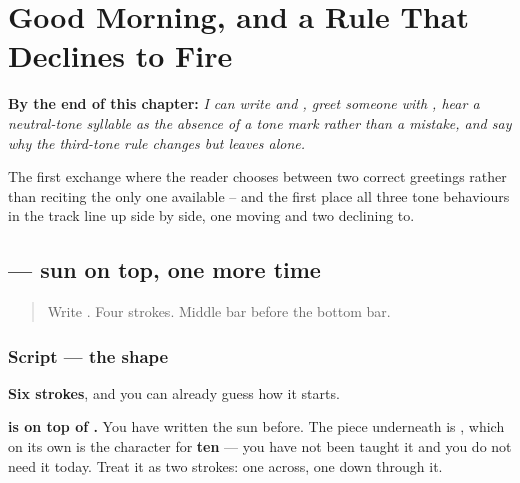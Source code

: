 
\chapter{Good Morning, and a Rule That Declines to Fire}
\label{ch:zh-zaoshang}

\begin{chapteropening}
\textbf{By the end of this chapter:} \emph{I can write  and , greet someone with , hear a neutral-tone syllable as the absence of a tone mark rather than a mistake, and say why the third-tone rule changes  but leaves  alone.}

The first exchange where the reader chooses between two correct greetings rather than reciting the only one available -- and the first place all three tone behaviours in the track line up side by side, one moving and two declining to.
\end{chapteropening}

\section[\texorpdfstring{\zh{早} (zǎo)}{早 (zǎo)}]{ — sun on top, one more time}

\label{lesson:ZH-W07-zao}



\begin{quote}
Write . Four strokes. Middle bar before the bottom bar.
\end{quote}

\subsection*{Script — the shape}

\begin{quote}
\end{quote}

\textbf{Six strokes}, and you can already guess how it starts.

\textbf{ is  on top of .} You have written the sun before. The piece underneath is \textbf{}, which on its own is the character for \textbf{ten} — you have not been taught it and you do not need it today. Treat it as two strokes: one across, one down through it.

